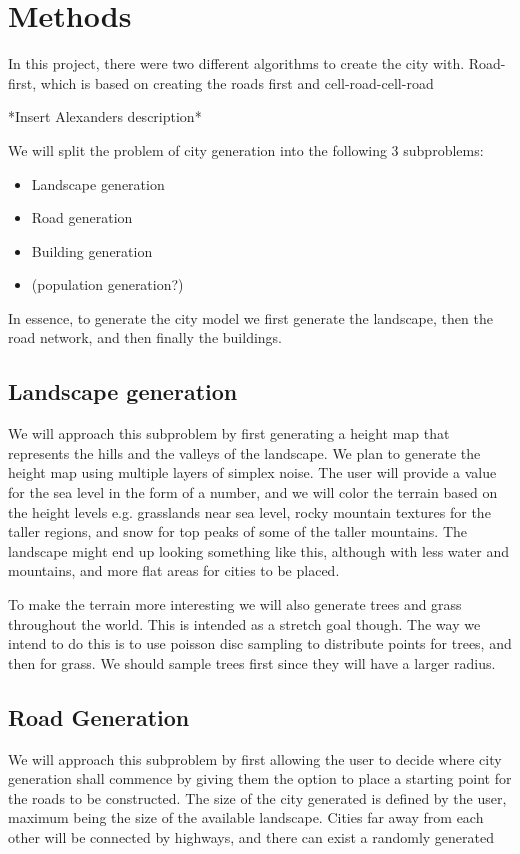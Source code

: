 \section{Methods}
In this project, there were two different algorithms to create the city with.
Road-first, which is based on creating the roads first and cell-road-cell-road 

*Insert Alexanders description* 

We will split the problem of city generation into the following 3 subproblems:
\begin{itemize}
  \item Landscape generation
  \item Road generation
  \item Building generation
  \item (population generation?)
\end{itemize}

In essence, to generate the city model we first generate the landscape, then the road network, and then finally the buildings. 

\subsection{Landscape generation}
We will approach this subproblem by first generating a height map that represents the hills and the valleys of the landscape.
We plan to generate the height map using multiple layers of simplex noise.
The user will provide a value for the sea level in the form of a number, and we will color the terrain based on the height levels e.g. grasslands near sea level, rocky mountain textures for the taller regions, and snow for top peaks of some of the taller mountains.
The landscape might end up looking something like this, although with less water and mountains, and more flat areas for cities to be placed.

To make the terrain more interesting we will also generate trees and grass throughout the world.
This is intended as a stretch goal though.
The way we intend to do this is to use poisson disc sampling to distribute points for trees, and then for grass. %
We should sample trees first since they will have a larger radius.

\subsection{Road Generation}
We will approach this subproblem by first allowing the user to decide where city generation shall commence by giving them the option to place a starting point for the roads to be constructed.
The size of the city generated is defined by the user, maximum being the size of the available landscape.
Cities far away from each other will be connected by highways, and there can exist a randomly generated 

